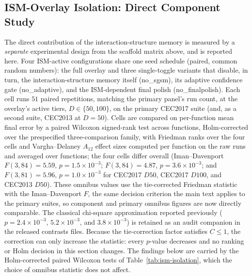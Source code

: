\documentclass[algorithms,article,submit,moreauthors,pdftex]{Definitions/mdpi}
\begin{document}
\subsection{ISM-Overlay Isolation: Direct Component Study}\label{sec:supp:ablation:sgsm}

The direct contribution of the interaction-structure memory is measured by a
\emph{separate} experimental design from the
scaffold matrix above, and is reported here.  Four ISM-active configurations
share one seed schedule (paired, common random numbers): the full overlay and
three single-toggle variants that disable, in turn, the interaction-structure
memory itself (no\_sgsm), its adaptive confidence gate
(no\_adaptive), and the ISM-dependent final polish
(no\_finalpolish).  Each cell runs $51$ paired repetitions,
matching the primary panel's run count, at the
overlay's active tiers, $D \in \{50, 100\}$, on the primary CEC2017 suite (and,
as a second suite, CEC2013 at $D = 50$).  Cells are compared on per-function
mean final error by a paired Wilcoxon signed-rank test across functions,
Holm-corrected over the prespecified three-comparison family, with Friedman
ranks over the four cells and Vargha--Delaney $A_{12}$ effect sizes computed
per function on the raw runs and averaged over functions; the four cells
differ overall (Iman--Davenport $F(3,84) = 5.59$,
$p = 1.5\times10^{-3}$; $F(3,84) = 4.87$, $p = 3.6\times10^{-3}$; and
$F(3,81) = 5.96$, $p = 1.0\times10^{-3}$ for CEC2017 $D50$, CEC2017 $D100$,
and CEC2013 $D50$).  These omnibus values use the tie-corrected Friedman
statistic with the Iman--Davenport $F$, the same decision criterion the
main text applies to the primary suites, so component and primary
omnibus figures are now directly comparable.  The classical chi-square
approximation reported previously ($p = 2.4\times10^{-3}$,
$5.2\times10^{-3}$, and $3.8\times10^{-3}$) is retained as an audit
companion in the released contrasts files.  Because the tie-correction
factor satisfies $C \leq 1$, the correction can only increase the
statistic: every $p$-value decreases and no ranking or Holm decision in
this section changes.  The findings below are carried by the
Holm-corrected paired Wilcoxon tests of Table~\ref{tab:ism-isolation},
which the choice of omnibus statistic does not affect.
\end{document}
